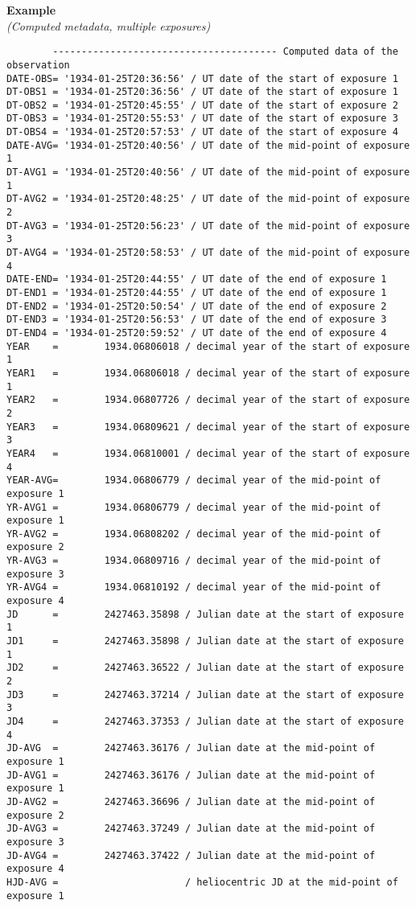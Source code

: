 \documentclass[11pt]{ivoa}
\newenvironment{fitsexample}[1]
{\bigskip\noindent\textbf{Example}\\\textit{(#1)\smallskip}}
{\medskip}
\begin{document}
\begin{fitsexample}{Computed metadata, multiple exposures}
\begin{lstlisting}
        --------------------------------------- Computed data of the observation
DATE-OBS= '1934-01-25T20:36:56' / UT date of the start of exposure 1
DT-OBS1 = '1934-01-25T20:36:56' / UT date of the start of exposure 1
DT-OBS2 = '1934-01-25T20:45:55' / UT date of the start of exposure 2
DT-OBS3 = '1934-01-25T20:55:53' / UT date of the start of exposure 3
DT-OBS4 = '1934-01-25T20:57:53' / UT date of the start of exposure 4
DATE-AVG= '1934-01-25T20:40:56' / UT date of the mid-point of exposure 1
DT-AVG1 = '1934-01-25T20:40:56' / UT date of the mid-point of exposure 1
DT-AVG2 = '1934-01-25T20:48:25' / UT date of the mid-point of exposure 2
DT-AVG3 = '1934-01-25T20:56:23' / UT date of the mid-point of exposure 3
DT-AVG4 = '1934-01-25T20:58:53' / UT date of the mid-point of exposure 4
DATE-END= '1934-01-25T20:44:55' / UT date of the end of exposure 1
DT-END1 = '1934-01-25T20:44:55' / UT date of the end of exposure 1
DT-END2 = '1934-01-25T20:50:54' / UT date of the end of exposure 2
DT-END3 = '1934-01-25T20:56:53' / UT date of the end of exposure 3
DT-END4 = '1934-01-25T20:59:52' / UT date of the end of exposure 4
YEAR    =        1934.06806018 / decimal year of the start of exposure 1
YEAR1   =        1934.06806018 / decimal year of the start of exposure 1
YEAR2   =        1934.06807726 / decimal year of the start of exposure 2
YEAR3   =        1934.06809621 / decimal year of the start of exposure 3
YEAR4   =        1934.06810001 / decimal year of the start of exposure 4
YEAR-AVG=        1934.06806779 / decimal year of the mid-point of exposure 1
YR-AVG1 =        1934.06806779 / decimal year of the mid-point of exposure 1
YR-AVG2 =        1934.06808202 / decimal year of the mid-point of exposure 2
YR-AVG3 =        1934.06809716 / decimal year of the mid-point of exposure 3
YR-AVG4 =        1934.06810192 / decimal year of the mid-point of exposure 4
JD      =        2427463.35898 / Julian date at the start of exposure 1
JD1     =        2427463.35898 / Julian date at the start of exposure 1
JD2     =        2427463.36522 / Julian date at the start of exposure 2
JD3     =        2427463.37214 / Julian date at the start of exposure 3
JD4     =        2427463.37353 / Julian date at the start of exposure 4
JD-AVG  =        2427463.36176 / Julian date at the mid-point of exposure 1
JD-AVG1 =        2427463.36176 / Julian date at the mid-point of exposure 1
JD-AVG2 =        2427463.36696 / Julian date at the mid-point of exposure 2
JD-AVG3 =        2427463.37249 / Julian date at the mid-point of exposure 3
JD-AVG4 =        2427463.37422 / Julian date at the mid-point of exposure 4
HJD-AVG =                      / heliocentric JD at the mid-point of exposure 1
\end{lstlisting}
\end{fitsexample}
\end{document}
